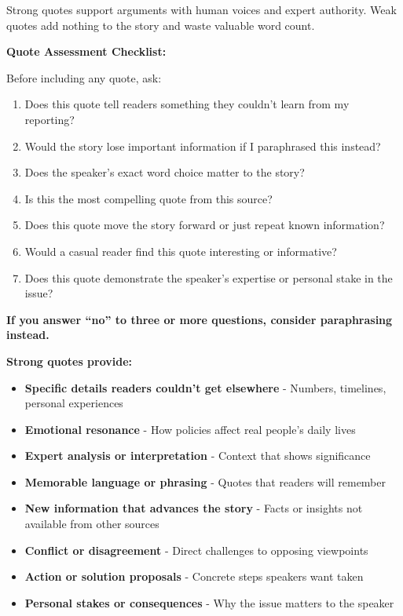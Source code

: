 \documentclass[12pt]{article}
\begin{document}
Strong quotes support arguments with human voices and expert authority. Weak quotes add nothing to the story and waste valuable word count.
\begin{examplebox}
\textbf{Quote Assessment Checklist:}

Before including any quote, ask:
\begin{enumerate}
    \item Does this quote tell readers something they couldn't learn from my reporting?
    \item Would the story lose important information if I paraphrased this instead?
    \item Does the speaker's exact word choice matter to the story?
    \item Is this the most compelling quote from this source?
    \item Does this quote move the story forward or just repeat known information?
    \item Would a casual reader find this quote interesting or informative?
    \item Does this quote demonstrate the speaker's expertise or personal stake in the issue?
\end{enumerate}

\textbf{If you answer ``no'' to three or more questions, consider paraphrasing instead.}
\end{examplebox}


\begin{afterbox}
\textbf{Strong quotes provide:}
\begin{itemize}
    \item \textbf{Specific details readers couldn't get elsewhere} - Numbers, timelines, personal experiences
    \item \textbf{Emotional resonance} - How policies affect real people's daily lives
    \item \textbf{Expert analysis or interpretation} - Context that shows significance
    \item \textbf{Memorable language or phrasing} - Quotes that readers will remember
    \item \textbf{New information that advances the story} - Facts or insights not available from other sources
    \item \textbf{Conflict or disagreement} - Direct challenges to opposing viewpoints
    \item \textbf{Action or solution proposals} - Concrete steps speakers want taken
    \item \textbf{Personal stakes or consequences} - Why the issue matters to the speaker 
\end{itemize}
\end{afterbox}
\end{document}
